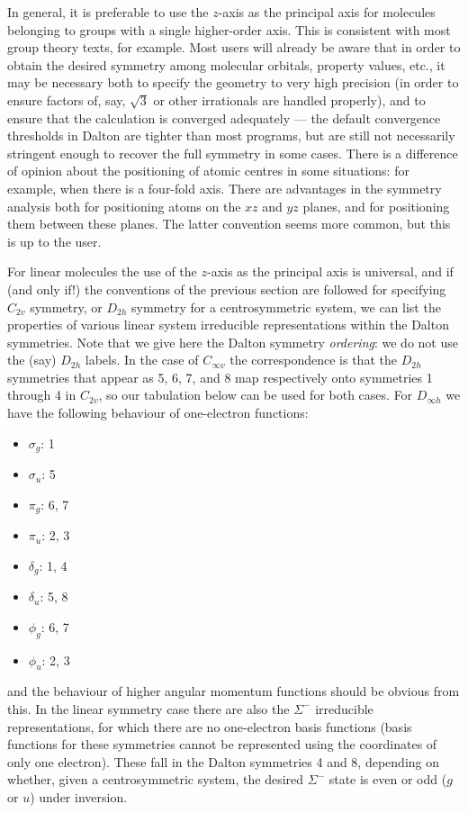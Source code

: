 In general, it is preferable to use the $z$-axis as the principal axis
for molecules belonging to groups with a single higher-order axis.
This is consistent with most group theory texts, for example.  Most
users will already be aware that in order to obtain the desired
symmetry among molecular orbitals, property values, etc., it may be
necessary both to specify the geometry to very high precision (in
order to ensure factors of, say, $\sqrt{3}$ or other irrationals are
handled properly), and to ensure that the calculation is converged
adequately --- the default convergence thresholds in Dalton are
tighter than most programs, but are still not necessarily stringent
enough to recover the full symmetry in some cases.  There is a
difference of opinion about the positioning of atomic centres in some
situations: for example, when there is a four-fold axis.  There are
advantages in the symmetry analysis both for positioning atoms on the
$xz$ and $yz$ planes, and for positioning them between these planes.
The latter convention seems more common, but this is up to the user.

For linear molecules the use of the $z$-axis as the principal axis is
universal, and if (and only if!) the conventions of the previous
section are followed for specifying $C_{2v}$ symmetry, or $D_{2h}$
symmetry for a centrosymmetric system, we can list the properties of
various linear system irreducible representations within the Dalton
symmetries.  Note that we give here the Dalton symmetry
\emph{ordering}: we do not use the (say) $D_{2h}$ labels.  In the case
of $C_{\infty v}$ the correspondence is that the $D_{2h}$ symmetries
that appear as 5, 6, 7, and 8 map respectively onto
symmetries 1 through 4 in $C_{2v}$, so our tabulation below can be
used for both cases.  For $D_{\infty h}$ we have the
following behaviour of one-electron functions:
\begin{itemize}
\item $\sigma_g$: 1
\item $\sigma_u$: 5
\item $\pi_g$: 6, 7
\item $\pi_u$: 2, 3
\item $\delta_g$: 1, 4
\item $\delta_u$: 5, 8
\item $\phi_g$: 6, 7
\item $\phi_u$: 2, 3
\end{itemize}
and the behaviour of higher angular momentum functions should be
obvious from this.  In the linear symmetry case there are also the
$\Sigma^-$ irreducible representations, for which there are no
one-electron basis functions (basis functions for these symmetries
cannot be represented using the coordinates of only one electron).
These fall in the Dalton symmetries 4 and 8, depending on whether,
given a centrosymmetric system, the desired $\Sigma^-$ state is even
or odd ($g$ or $u$) under inversion.

